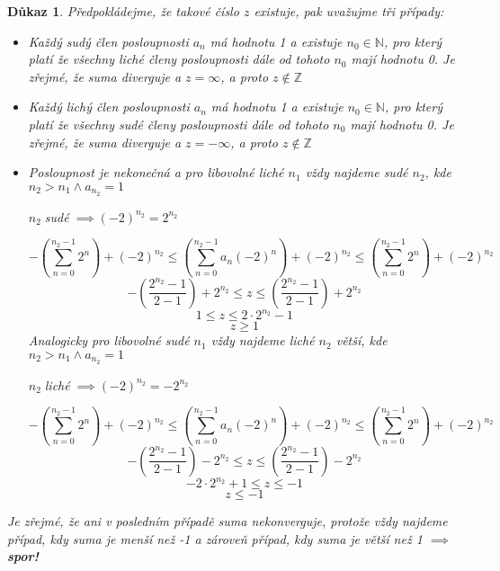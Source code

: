 \documentclass[12pt]{book}
\newtheorem*{dukaz}{Důkaz}
\begin{document}
\begin{dukaz}
	Předpokládejme, že takové číslo $z$ existuje, pak uvažujme tři případy:
	\begin{itemize}
		\item[$a)$]
		      Každý sudý člen posloupnosti $a_n$ má hodnotu 1 a existuje $n_0\in\mathbb{N}$, pro který platí že všechny liché členy posloupnosti dále od tohoto $n_0$ mají hodnotu 0.
		      Je zřejmé, že suma diverguje a $z=\infty$, a proto $z \notin \mathbb{Z}$
		\item[$b)$]Každý lichý člen posloupnosti $a_n$ má hodnotu 1 a existuje $n_0\in\mathbb{N}$, pro který platí že všechny sudé členy posloupnosti dále od tohoto $n_0$ mají hodnotu 0.
		      Je zřejmé, že suma diverguje a $z=-\infty$, a proto $z \notin \mathbb{Z}$
		\item[$c)$] Posloupnost je nekonečná a pro libovolné liché $n_1$ vždy najdeme sudé $n_2$, kde $ n_2>n_1 \land a_{n_2}=1$
		      \begin{center}$ n_2 \; $sudé$ \; \implies (-2)^{n_2} = 2^{n_2}$\end{center}
		      $$-\left(\sum_{n=0}^{n_2-1}2^n\right)+(-2)^{n_2}\leq \left(\sum_{n=0}^{n_2-1}a_n(-2)^n\right)+(-2)^{n_2}  \leq\left(\sum_{n=0}^{n_2-1}2^n\right)+(-2)^{n_2}$$
		      $$-\left(\frac{2^{n_2}-1}{2-1}\right)+2^{n_2}\leq z \leq\left(\frac{2^{n_2}-1}{2-1} \right)+2^{n_2}$$
		      $$1\leq z\leq 2\cdot2^{n_2}-1$$
		      $$z\ge1$$
		      Analogicky pro libovolné sudé $n_1$ vždy najdeme liché $n_2$ větší, kde $ n_2>n_1 \land a_{n_2}=1$
		      \begin{center}$ n_2 \; $liché$ \; \implies (-2)^{n_2} = -2^{n_2}$\end{center}
		      $$-\left(\sum_{n=0}^{n_2-1}2^n\right)+(-2)^{n_2}\leq \left(\sum_{n=0}^{n_2-1}a_n(-2)^n\right)+(-2)^{n_2}  \leq\left(\sum_{n=0}^{n_2-1}2^n\right)+(-2)^{n_2}$$
		      $$-\left(\frac{2^{n_2}-1}{2-1}\right)-2^{n_2}\leq   z \leq\left(\frac{2^{n_2}-1}{2-1} \right)-2^{n_2}$$
		      $$-2\cdot2^{n_2}+1\leq z\leq -1$$
		      $$z\le-1$$
		      
	\end{itemize}
	Je zřejmé, že ani v posledním případě suma nekonverguje, protože vždy najdeme případ, kdy suma je menší než -1 a zároveň případ, kdy suma je větší než 1 $\implies$ \textbf{spor!}
	
\end{dukaz}
\end{document}
